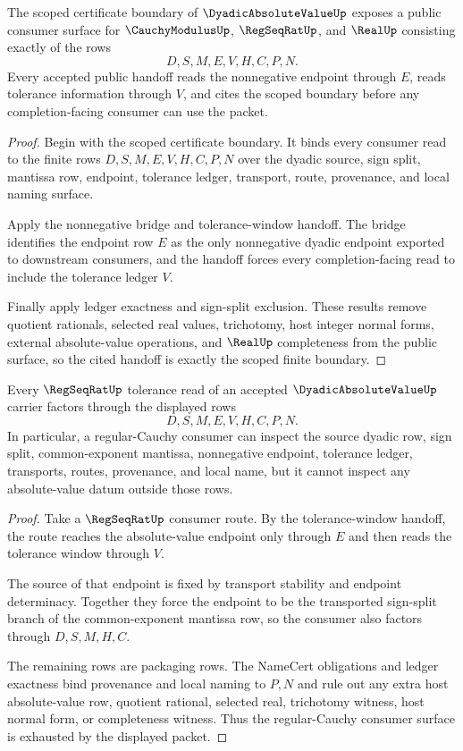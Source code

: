 \begin{theorem}
\label{thm:dyadic-absolute-value-scoped-closure-public-handoff}
The scoped certificate boundary of $\DyadicAbsoluteValueUp$ exposes a public consumer surface for $\CauchyModulusUp$, $\RegSeqRatUp$, and $\RealUp$ consisting exactly of the rows
$$
D,S,M,E,V,H,C,P,N.
$$
Every accepted public handoff reads the nonnegative endpoint through $E$, reads tolerance information through $V$, and cites the scoped boundary before any completion-facing consumer can use the packet.
\end{theorem}
\begin{proof}
Begin with the scoped certificate boundary. It binds every consumer read to the finite rows $D,S,M,E,V,H,C,P,N$ over the dyadic source, sign split, mantissa row, endpoint, tolerance ledger, transport, route, provenance, and local naming surface.

Apply the nonnegative bridge and tolerance-window handoff. The bridge identifies the endpoint row $E$ as the only nonnegative dyadic endpoint exported to downstream consumers, and the handoff forces every completion-facing read to include the tolerance ledger $V$.

Finally apply ledger exactness and sign-split exclusion. These results remove quotient rationals, selected real values, trichotomy, host integer normal forms, external absolute-value operations, and $\RealUp$ completeness from the public surface, so the cited handoff is exactly the scoped finite boundary.
\end{proof}

\begin{theorem}
\label{thm:dyadic-absolute-value-regseqrat-consumer-exhaustion}
Every $\RegSeqRatUp$ tolerance read of an accepted $\DyadicAbsoluteValueUp$ carrier factors through the displayed rows
$$
D,S,M,E,V,H,C,P,N.
$$
In particular, a regular-Cauchy consumer can inspect the source dyadic row, sign split, common-exponent mantissa, nonnegative endpoint, tolerance ledger, transports, routes, provenance, and local name, but it cannot inspect any absolute-value datum outside those rows.
\end{theorem}
\begin{proof}
Take a $\RegSeqRatUp$ consumer route. By the tolerance-window handoff, the route reaches the absolute-value endpoint only through $E$ and then reads the tolerance window through $V$.

The source of that endpoint is fixed by transport stability and endpoint determinacy. Together they force the endpoint to be the transported sign-split branch of the common-exponent mantissa row, so the consumer also factors through $D,S,M,H,C$.

The remaining rows are packaging rows. The NameCert obligations and ledger exactness bind provenance and local naming to $P,N$ and rule out any extra host absolute-value row, quotient rational, selected real, trichotomy witness, host normal form, or completeness witness. Thus the regular-Cauchy consumer surface is exhausted by the displayed packet.
\end{proof}

